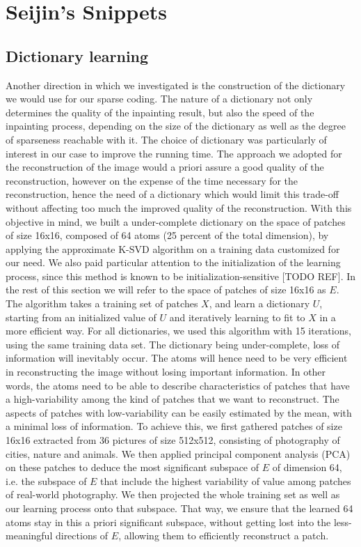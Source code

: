 \section*{Seijin's Snippets}

\subsection{Dictionary learning}

Another direction in which we investigated is the construction of the dictionary we would use for our sparse coding. The nature of a dictionary not only determines the quality of the inpainting result, but also the speed of the inpainting process, depending on the size of the dictionary as well as the degree of sparseness reachable with it. 
The choice of dictionary was particularly of interest in our case to improve the running time. The approach we adopted for the reconstruction of the image would a priori assure a good quality of the reconstruction, however on the expense of the time necessary for the reconstruction, hence the need of a dictionary which would limit this trade-off without affecting too much the improved quality of the reconstruction.
With this objective in mind, we built a under-complete dictionary on the space of patches of size 16x16, composed of 64 atoms (25 percent of the total dimension), by applying the approximate K-SVD algorithm on a training data customized for our need. We also paid particular attention to the initialization of the learning process, since this method is known to be initialization-sensitive [TODO REF]. In the rest of this section we will refer to the space of patches of size 16x16 as $E$.
The algorithm takes a training set of patches $X$, and learn a dictionary $U$, starting from an initialized value of $U$ and iteratively learning to fit to $X$ in a more efficient way. 
For all dictionaries, we used this algorithm with 15 iterations, using the same training data set.
The dictionary being under-complete, loss of information will inevitably occur. The atoms will hence need to be very efficient in reconstructing the image without losing important information. In other words, the atoms need to be able to describe characteristics of patches that have a high-variability among the kind of patches that we want to reconstruct. The aspects of patches with low-variability can be easily estimated by the mean, with a minimal loss of information. 
To achieve this, we first gathered patches of size 16x16 extracted from 36 pictures of size 512x512, consisting of photography of cities, nature and animals. We then applied principal component analysis (PCA) on these patches to deduce the most significant subspace of $E$ of dimension 64, i.e. the subspace of $E$ that include the highest variability of value among patches of real-world photography. We then projected the whole training set as well as our learning process onto that subspace. That way, we ensure that the learned 64 atoms stay in this a priori significant subspace, without getting lost into the less-meaningful directions of $E$, allowing them to efficiently reconstruct a patch.
